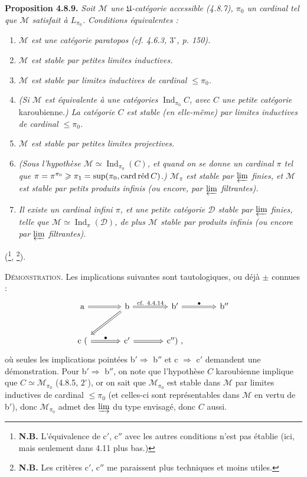 \documentclass[11pt]{article}
\newcommand{\msp}[1]{\marginpar{\footnotesize [#1]}}
\newcommand{\Ind}{\operatorname{Ind}}
\newcommand{\card}{\operatorname{card}}
\begin{document}
\msp{page 207}
\textbf{Proposition 4.8.9.} \textit{Soit $\mathcal{M}$ une $\mathfrak{U}$-catégorie accessible (4.8.7), $\pi_0$ un cardinal tel que $\mathcal{M}$ satisfait à $L_{\pi_0}$. Conditions équivalentes :}
\begin{enumerate}
\item[\textit{a)}] \textit{$\mathcal{M}$ est une catégorie paratopos (cf. 4.6.3, $3^\circ$, p. 150).}
\item[\textit{b)}] \textit{$\mathcal{M}$ est stable par petites limites inductives.}
\item[\textit{b$'$)}] \textit{$\mathcal{M}$ est stable par limites inductives de cardinal $\leqslant\pi_0$.}
\item[\textit{b$''$)}] \textit{(Si $\mathcal{M}$ est équivalente à une catégories} $\Ind_{\pi_0}C$\textit{, avec $C$ une petite catégorie} karoubienne.\textit{) La catégorie $C$ est stable (en elle-même) par limites inductives de cardinal $\leqslant\pi_0$.} %
\item[\textit{c)}] \textit{$\mathcal{M}$ est stable par petites limites projectives.}
\item[\textit{c$'$)}] \textit{(Sous l'hypothèse $\mathcal{M}\simeq\Ind_{\pi_0}(C)$, et quand on se donne un cardinal $\pi$ tel que $\pi=\pi^{\pi_0}\geqslant\pi_1=\sup(\pi_0,\card\textup{réd}\,C)$.) $\mathcal{M}_\pi$ est stable par $\varprojlim$ finies, et $\mathcal{M}$ est stable par petits produits infinis (ou encore, par $\varprojlim$ filtrantes).}
\item[\textit{c$''$)}] \textit{Il existe un cardinal infini $\pi$, et une petite catégorie $\mathcal{D}$ stable par $\varprojlim$ finies, telle que $\mathcal{M}\simeq\Ind_\pi(\mathcal{D})$, de plus $\mathcal{M}$ stable par produits infinis (ou encore par $\varprojlim$ filtrantes).}
\end{enumerate}
(\footnote{\textbf{N.B.} L'équivalence de c$'$, c$''$ avec les autres conditions n'est pas établie (ici, mais seulement dans 4.11 plus bas.)}, \footnote{\textbf{N.B.} Les critères c$'$, c$''$ me paraissent plus techniques et moins utiles.}).

\textsc{Démonstration.} Les implications suivantes sont tautologiques, ou déjà $\pm$ connues :
\[
\begin{tikzcd}[column sep=large, row sep=large]
\mathrm{a} \arrow[r, Rightarrow] & \mathrm{b} \arrow[r, Rightarrow, "\text{cf. 4.4.14}"] \arrow[dl, Rightarrow] & \mathrm{b}' \arrow[r, Rightarrow, "\bullet"] & \mathrm{b}'' \\
\mathrm{c}\ ( \arrow[r, Rightarrow, "\bullet"] & \mathrm{c}' \arrow[r, Rightarrow] & \mathrm{c}'')\ , &
\end{tikzcd}
\]
\msp{page 208}
où seules les implications pointées b$'\Longrightarrow$ b$''$ et c $\Longrightarrow$ c$'$ demandent une démonstration. Pour b$'\Longrightarrow$ b$''$, on note que l'hypothèse $C$ karoubienne implique que $C\simeq\mathcal{M}_{\pi_0}$ (4.8.5, $2^\circ$), or on sait que $\mathcal{M}_{\pi_0}$ est stable dans $\mathcal{M}$ par limites inductives de cardinal $\leqslant\pi_0$ (et celles-ci sont représentables dans $\mathcal{M}$ en vertu de b$'$), donc $\mathcal{M}_{\pi_0}$ admet des $\varinjlim$ du type envisagé, donc $C$ aussi.
\end{document}
